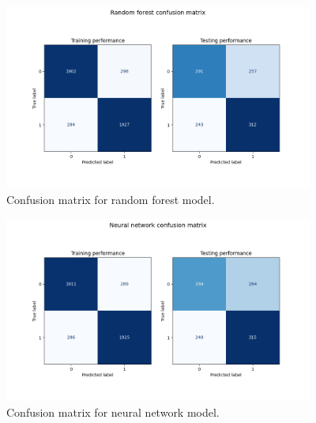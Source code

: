 \documentclass[11pt]{article}
\begin{document}
\begin{figure}[h!]
\centering
\begin{center} \includegraphics[width=4in]{"../output/rf_confusion_matrix.png"} \end{center}
\caption{Confusion matrix for random forest model.}
\label{fig:rf-cm}
\end{figure}

\begin{figure}[h!]
\centering
\begin{center} \includegraphics[width=4in]{"../output/nn_confusion_matrix.png"} \end{center}
\caption{Confusion matrix for neural network model.}
\label{fig:nn-cm}
\end{figure}
\end{document}
